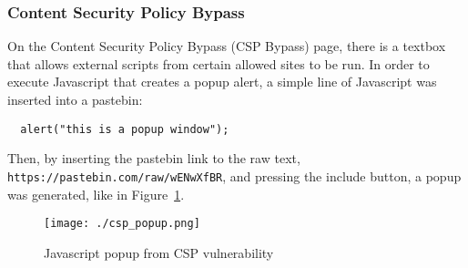 \documentclass[11pt]{article}
\begin{document}
\subsubsection*{Content Security Policy Bypass}
On the Content Security Policy Bypass (CSP Bypass) page, there is a textbox that allows external scripts from certain allowed sites
to be run. In order to execute Javascript that creates a popup alert, a simple line of Javascript was inserted into a pastebin:
\begin{verbatim}
  alert("this is a popup window");
\end{verbatim}
Then, by inserting the pastebin link to the raw text, \\
\verb|https://pastebin.com/raw/wENwXfBR|, and pressing the include button, a popup
was generated, like in Figure~\ref{fig:CSP}.
\begin{figure}[!h]
  \centering
  \texttt{[image: ./csp\_popup.png]}
  \caption{\label{fig:CSP}
  Javascript popup from CSP vulnerability}
\end{figure}
\end{document}
